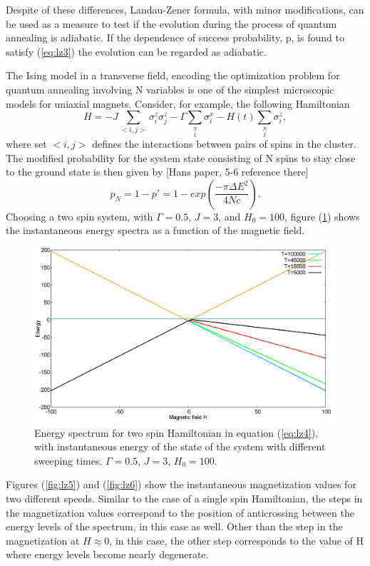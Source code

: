 \documentclass[../main.tex]{subfiles}
\begin{document}
Despite of these differences, Landau-Zener formula, with minor modifications, can be used as a measure to test if the evolution during the process of quantum annealing is adiabatic. If the dependence of success probability, p, is found to satisfy (\ref{eq:lz3}) the evolution can be regarded as adiabatic.

The Ising model in a transverse field, encoding the optimization problem for quantum annealing involving N variables is one of the simplest microscopic models for uniaxial magnets. Consider, for example, the following Hamiltonian
\begin{equation}
H=-J \sum \limits_{<i,j>} \sigma_i^z \sigma_j^z - \Gamma \sum \limits_i \limits^N \sigma_i^x -H(t) \sum \limits_i \limits^N\sigma_i^z, \label{eq:lz4}
\end{equation} 
where set $<i,j>$ defines the interactions between pairs of spins in the cluster. The modified probability for the system state consisting of N spins to stay close to the ground state is then given by [Hans paper, 5-6 reference there]\\
\begin{equation}
p_N=1-p'=1-exp(\frac{-\pi {\Delta E}^2}{4Nc}). \label{eq:lz5}
\end{equation}
Choosing a two spin system, with $\Gamma=0.5$, $J=3$, and $H_0=100$, figure (\ref{fig:lz4}) shows the instantaneous energy spectra as a function of the magnetic field.
\begin{figure}[H]
\centering 
\includegraphics[scale=0.3]{EnergySpectrum_H100.png}
\caption{Energy spectrum for two spin Hamiltonian in equation (\ref{eq:lz4}), with instantaneous energy of the state of the system with different sweeping times. $\Gamma=0.5$, $J=3$, $H_0=100$.}
\label{fig:lz4}
\end{figure}
Figures (\ref{fig:lz5}) and (\ref{fig:lz6}) show the instantaneous magnetization values for two different speeds. Similar to the case of a single spin Hamiltonian, the steps in the magnetization values correspond to the position of anticrossing between the energy levels of the spectrum, in this case as well. Other than the step in the magnetization at $H \approx 0$, in this case, the other step corresponds to the value of H where energy levels become nearly degenerate.
\end{document}
